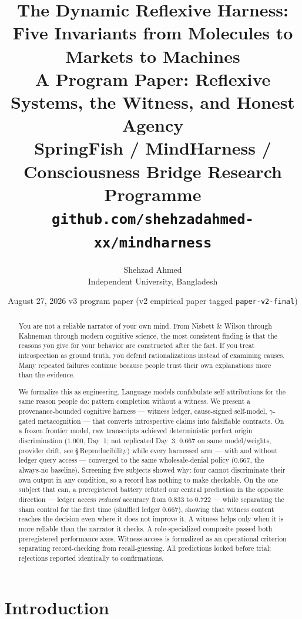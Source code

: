 \documentclass[11pt]{article}
\title{The Dynamic Reflexive Harness:\\[4pt]
\Large Five Invariants from Molecules to Markets to Machines\\[6pt]
\normalsize A Program Paper: Reflexive Systems, the Witness, and Honest Agency\\[4pt]
\normalsize SpringFish / MindHarness / Consciousness Bridge Research Programme\\
\texttt{github.com/\allowbreak{}shehzadahmed-\allowbreak{}xx/\allowbreak{}mindharness}}
\author{Shehzad Ahmed \\ \small Independent University, Bangladesh}
\date{August 27, 2026 \textemdash{} v3 program paper (v2 empirical paper tagged \texttt{paper-\allowbreak{}v2-\allowbreak{}final})}
\begin{document}
\maketitle

\begin{abstract}
You are not a reliable narrator of your own mind. From Nisbett \& Wilson
through Kahneman through modern cognitive science, the most consistent
finding is that the reasons you give for your behavior are constructed
after the fact. If you treat introspection as ground truth, you defend
rationalizations instead of examining causes. Many repeated failures
continue because people trust their own explanations more than the
evidence.

We formalize this as engineering. Language models confabulate
self-attributions for the same reason people do: pattern completion
without a witness. We present a provenance-bounded cognitive harness
--- witness ledger, cause-signed self-model, $\gamma$-gated
metacognition --- that converts introspective claims into falsifiable
contracts. On a frozen frontier
model, raw transcripts achieved deterministic perfect origin
discrimination ($1.000$, Day~1; not replicated Day~3: $0.667$ on same model/weights, provider drift, see \S\,Reproducibility) while every harnessed arm --- with and without
ledger query access --- converged to the same wholesale-denial policy
($0.667$, the always-no baseline). Screening five subjects showed why:
four cannot discriminate their own output in any condition, so a record
has nothing to make checkable. On the one subject that can, a
preregistered battery refuted our central prediction in the opposite
direction --- ledger access \emph{reduced} accuracy from $0.833$ to
$0.722$ --- while separating the sham control for the first time
(shuffled ledger $0.667$), showing that witness content reaches the
decision even where it does not improve it. A witness helps only when it
is more reliable than the narrator it checks. A role-specialized composite passed both
preregistered performance axes. Witness-access is formalized as an
operational criterion separating record-checking from recall-guessing.
All predictions locked before trial; rejections reported identically to
confirmations.
\end{abstract}

\section{Introduction}\label{sec:intro}
\end{document}
